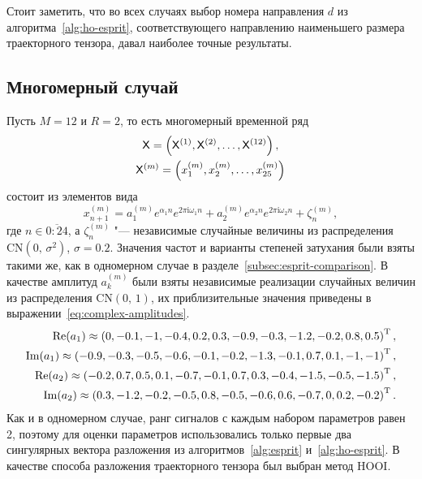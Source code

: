 \documentclass[specialist,
  substylefile=spbu_report.rtx,
subf,href,colorlinks=true, 12pt]{disser}
\theoremstyle{plain}
\theoremstyle{definition}
\theoremstyle{remark}
\newcommand{\iu}{\mathrm{i}}
\begin{document}
Стоит заметить, что во всех случаях выбор номера направления $d$ из
алгоритма~\ref{alg:ho-esprit}, соответствующего направлению
наименьшего размера
траекторного тензора, давал наиболее точные результаты.

\subsection{Многомерный случай}\label{subsec:mv-esprit-comparison}
Пусть $M=12$ и $R=2$, то есть многомерный временной ряд
\begin{gather*}
  \mathsf{X} = \left(\mathsf{X}^{(1)}, \mathsf{X}^{(2)}, \ldots, \mathsf{X}^{(12)}\right),\\
  \mathsf{X}^{(m)} = \left(x_1^{(m)}, x_2^{(m)}, \ldots, x_{25}^{(m)}\right)
\end{gather*}
состоит из элементов вида
\[
  x_{n + 1}^{(m)} = a_1^{(m)} e^{ \alpha_1 n }
  e^{2 \pi \iu \omega_1 n} +
  a_2^{(m)} e^{ \alpha_2 n }
  e^{2 \pi \iu \omega_2 n} + \zeta_n^{(m)},
\]
где $n \in \overline{0:24}$, а $\zeta_n^{(m)}$ "--- независимые
случайные величины из
распределения $\mathrm{CN}(0,\, \sigma^2)$, $\sigma=0.2$.
Значения частот и варианты степеней затухания были взяты такими же, как
в одномерном случае в разделе~\ref{subsec:esprit-comparison}.
В качестве амплитуд $a_k^{(m)}$ были взяты независимые реализации
случайных величин из распределения $\mathrm{CN}(0,\, 1)$,
их приблизительные значения приведены в
выражении~\eqref{eq:complex-amplitudes}.
\begin{gather}
  \label{eq:complex-amplitudes}
  \begin{split}
    \operatorname{Re}(a_1) \approx \left( 0, -0.1, -1, -0.4, 0.2,
    0.3, -0.9, -0.3, -1.2, -0.2, 0.8, 0.5\right)^{\mathrm{T}}, \\
    \operatorname{Im}(a_1) \approx \left(-0.9, -0.3, -0.5, -0.6,
    -0.1, -0.2, -1.3, -0.1, 0.7, 0.1, -1, -1 \right)^{\mathrm{T}}, \\
    \operatorname{Re}(a_2) \approx \left( -0.2, 0.7, 0.5, 0.1, -0.7,
    -0.1, 0.7, 0.3, -0.4, -1.5, -0.5, -1.5\right)^{\mathrm{T}}, \\
    \operatorname{Im}(a_2) \approx \left( 0.3, -1.2, -0.2, -0.5, 0.8,
    -0.5, -0.6, 0.6, -0.7, 0, 0.2, -0.2\right)^{\mathrm{T}}. \\
  \end{split}
\end{gather}
Как и в одномерном случае, ранг сигналов с каждым набором параметров равен 2,
поэтому для оценки параметров использовались только первые два
сингулярных вектора разложения из алгоритмов~\ref{alg:esprit}
и~\ref{alg:ho-esprit}.
В качестве способа разложения траекторного тензора был выбран метод HOOI.
\end{document}
